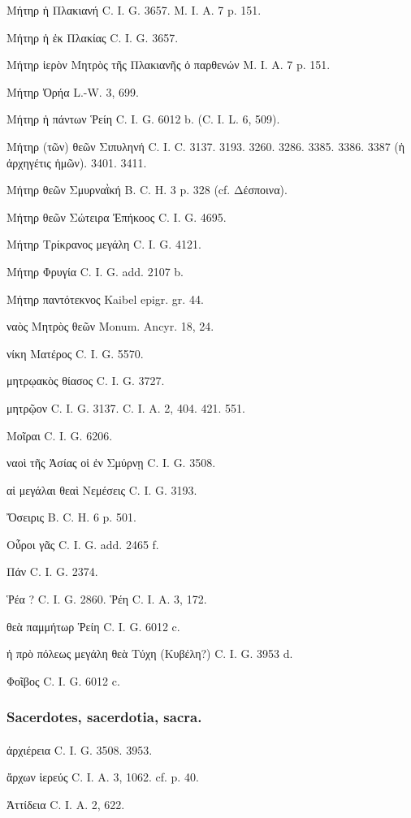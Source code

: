 \documentclass[a4paper, 11pt, oneside, polutonikogreek, german]{article}
\begin{document}
Μήτηρ ἡ Πλακιανή C. I. G. 3657. M. I. A. 7 p. 151.

Μήτηρ ἡ ἐκ Πλακίας C. I. G. 3657.

Μήτηρ ἱερὸν Μητρὸς τῆς Πλακιανῆς ὁ παρθενών M. I. A. 7 p. 151.

Μήτηρ Ὀρήα L.-W. 3, 699.

Μήτηρ ἡ πάντων Ῥείη C. I. G. 6012 b. (C. I. L. 6, 509).

Μήτηρ (τῶν) θεῶν Σιπυληνή C. I. C. 3137. 3193. 3260. 3286. 3385. 3386. 3387 (ἡ ἀρχηγέτις ἡμῶν). 3401. 3411.

Μήτηρ θεῶν Σμυρναῒκή B. C. H. 3 p. 328 (cf. Δέσποινα).

Μήτηρ θεῶν Σώτειρα Ἐπήκοος C. I. G. 4695.

Μήτηρ Τρίκρανος μεγάλη C. I. G. 4121.

Μήτηρ Φρυγία C. I. G. add. 2107 b.

Μήτηρ παντότεκνος Kaibel epigr. gr. 44.

ναὸς Μητρὸς θεῶν Monum. Ancyr. 18, 24.

νίκη Ματέρος C. I. G. 5570.

μητρῳακὸς θίασος C. I. G. 3727.

μητρῷον C. I. G. 3137. C. I. A. 2, 404. 421. 551.

Μοῖραι C. I. G. 6206.

ναοὶ τῆς Ἀσίας οἱ ἐν Σμύρνῃ C. I. G. 3508.

αἱ μεγάλαι θεαὶ Νεμέσεις C. I. G. 3193.

Ὄσειρις B. C. H. 6 p. 501.

Οὖροι γᾶς C. I. G. add. 2465 f.

Πάν C. I. G. 2374.

Ῥέα ? C. I. G. 2860. Ῥέη C. I. A. 3, 172.

θεὰ παμμήτωρ Ῥείη C. I. G. 6012 c.

ἡ πρὸ πόλεως μεγάλη θεὰ Τύχη (Κυβέλη?) C. I. G. 3953 d.

Φοῖβος C. I. G. 6012 c.

\subsubsection{Sacerdotes, sacerdotia, sacra.}
\paragraph{}
ἀρχιέρεια C. I. G. 3508. 3953.

ἄρχων ἱερεύς C. I. A. 3, 1062. cf. p. 40.

Ἀττίδεια C. I. A. 2, 622.
\end{document}
